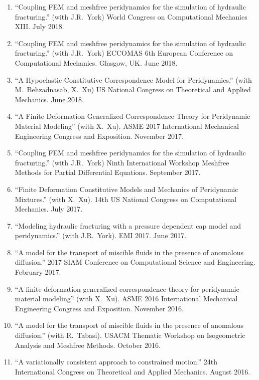 \else
\ifdefined\ispdf
\begin{etaremune}
\else
\begin{enumerate}
\fi
    \item ``Coupling FEM and meshfree peridynamics for the simulation of hydraulic fracturing.'' (with J.R.\ York) World Congress on Computational Mechanics XIII. July 2018.
    \item ``Coupling FEM and meshfree peridynamics for the simulation of hydraulic fracturing.'' (with J.R.\ York) ECCOMAS 6th European Conference on Computational Mechanics. Glasgow, UK. June 2018.
    \item ``A Hypoelastic Constitutive Correspondence Model for Peridynamics.'' (with M.\ Behzadnasab, X.\ Xu) US National Congress on Theoretical and Applied Mechanics. June 2018.
    \item ``A Finite Deformation Generalized Correspondence Theory for Peridynamic Material Modeling'' (with X.\ Xu). ASME 2017 International Mechanical Engineering Congress and Exposition. November 2017.
    \item ``Coupling FEM and meshfree peridynamics for the simulation of hydraulic fracturing.'' (with J.R.\ York) Ninth International Workshop Meshfree Methods for Partial Differential Equations. September 2017.
    \item ``Finite Deformation Constitutive Models and Mechanics of Peridynamic Mixtures.'' (with X.\ Xu). 14th US National Congress on Computational Mechanics. July 2017.
    \item ``Modeling hydraulic fracturing with a pressure dependent cap model and peridynamics.'' (with J.R.\ York). EMI 2017. June 2017.
    \item ``A model for the transport of miscible fluids in the presence of anomalous diffusion.'' 2017 SIAM Conference on Computational Science and Engineering.  February 2017.
    \item ``A finite deformation generalized correspondence theory for peridynamic material modeling'' (with X.\ Xu). ASME 2016 International Mechanical Engineering Congress and Exposition. November 2016.
    \item ``A model for the transport of miscible fluids in the presence of anomalous diffusion.'' (with R.\ Tabasi). USACM Thematic Workshop on Isogeometric Analysis and Meshfree Methods.  October 2016.
    \item ``A variationally consistent approach to constrained motion.'' 24th International Congress on Theoretical and Applied Mechanics.  August 2016.

\end{enumerate}
\end{etaremune}
